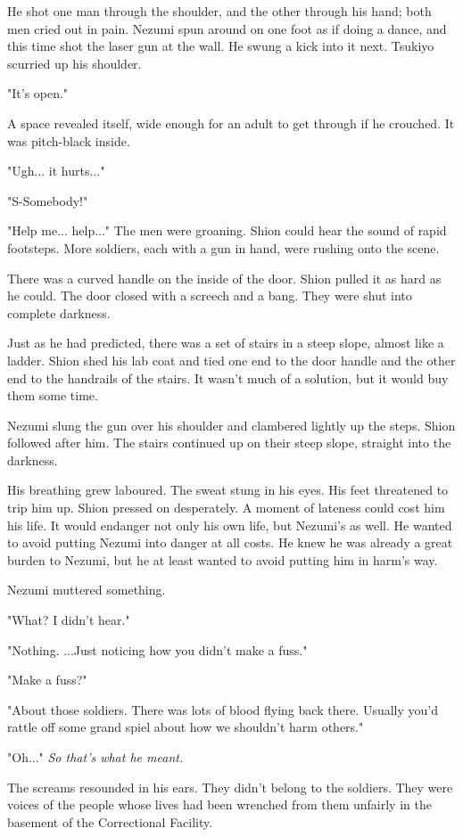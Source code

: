 He shot one man through the shoulder, and the other through his hand;
both men cried out in pain. Nezumi spun around on one foot as if doing a
dance, and this time shot the laser gun at the wall. He swung a kick
into it next. Tsukiyo scurried up his shoulder.

"It's open."

A space revealed itself, wide enough for an adult to get through if he
crouched. It was pitch-black inside.

"Ugh... it hurts..."

"S-Somebody!"

"Help me... help..." The men were groaning. Shion could hear the sound
of rapid footsteps. More soldiers, each with a gun in hand, were rushing
onto the scene.

There was a curved handle on the inside of the door. Shion pulled it as
hard as he could. The door closed with a screech and a bang. They were
shut into complete darkness.

Just as he had predicted, there was a set of stairs in a steep slope,
almost like a ladder. Shion shed his lab coat and tied one end to the
door handle and the other end to the handrails of the stairs. It wasn't
much of a solution, but it would buy them some time.

Nezumi slung the gun over his shoulder and clambered lightly up the
steps. Shion followed after him. The stairs continued up on their steep
slope, straight into the darkness.

His breathing grew laboured. The sweat stung in his eyes. His feet
threatened to trip him up. Shion pressed on desperately. A moment of
lateness could cost him his life. It would endanger not only his own
life, but Nezumi's as well. He wanted to avoid putting Nezumi into
danger at all costs. He knew he was already a great burden to Nezumi,
but he at least wanted to avoid putting him in harm's way.

Nezumi muttered something.

"What? I didn't hear."

"Nothing. ...Just noticing how you didn't make a fuss."

"Make a fuss?"

"About those soldiers. There was lots of blood flying back there.
Usually you'd rattle off some grand spiel about how we shouldn't harm
others."

"Oh..." \emph{So that's what he meant.}

The screams resounded in his ears. They didn't belong to the soldiers.
They were voices of the people whose lives had been wrenched from them
unfairly in the basement of the Correctional Facility.

